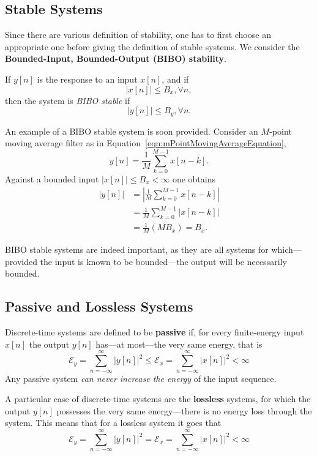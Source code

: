 \documentclass[\documentfontsize, twocolumn]{\classname}
\begin{document}
\subsection{Stable Systems}\label{sec:BIBOStableSystems}

Since there are various definition of stability, one has to first choose an appropriate one before giving the definition of stable systems. We consider the \textbf{Bounded-Input, Bounded-Output (BIBO) stability}.

If $y[n]$ is the response to an input $x[n]$, and if \[|x[n]| \leq B_x, \forall n,\] then the system is \emph{BIBO stable} if \[|y[n]| \leq B_y,\forall n.\]

An example of a BIBO stable system is soon provided. Consider an $M$-point moving average filter as in Equation~\ref{eqn:mPointMovingAverageEquation},
\[
    y[n] = \frac 1 M \sum_{k=0}^{M-1} x[n-k].
\]
Against a bounded input $|x[n]| \leq B_x < \infty$ one obtains
\begin{align*}
    |y[n]| &= \left| \frac 1 M \sum_{k=0}^{M-1} x[n-k]\right|\\
           &= \frac 1 M \sum_{k=0}^{M-1} \left| x[n-k]\right|\\
           &= \frac 1 M (MB_x) = B_x.
\end{align*}

BIBO stable systems are indeed important, as they are all systems for which---provided the input is known to be bounded---the output will be necessarily bounded.

\subsection{Passive and Lossless Systems}

Discrete-time systems are defined to be \textbf{passive} if, for every finite-energy input $x[n]$ the output $y[n]$ has---at most---the very same energy, that is
\begin{equation}\label{eqn:passiveSystemsDefinition}
    \mathcal E_y = \sum_{n=-\infty}^{\infty} | y[n] |^2
    \leq \mathcal E_x = \sum_{n=-\infty}^{\infty} | x[n] |^2 < \infty
\end{equation}
Any passive system \emph{can never increase the energy} of the input sequence.

A particular case of discrete-time systems are the \textbf{lossless} systems, for which the output $y[n]$ possesses the very same energy---there is no energy loss through the system. This means that for a lossless system it goes that
\begin{equation}\label{eqn:losslessSystemsDefinition}
    \mathcal E_y = \sum_{n=-\infty}^{\infty} | y[n] |^2
    = \mathcal E_x = \sum_{n=-\infty}^{\infty} | x[n] |^2 < \infty
\end{equation}
\end{document}
